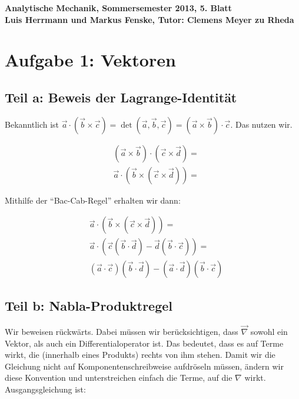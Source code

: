 \documentclass[a4paper,german,12pt,smallheadings]{scrartcl}
\begin{document}
\begin{center}
\bfseries %
\sffamily %
\vspace{-40pt}
Analytische Mechanik, Sommersemester 2013, 5. Blatt \\
Luis Herrmann und Markus Fenske, Tutor: Clemens Meyer zu Rheda
\vspace{-10pt}
\end{center}
\section*{Aufgabe 1: Vektoren}
\subsection*{Teil a: Beweis der Lagrange-Identität}

Bekanntlich ist $\vec{a} \cdot (\vec{b} \times \vec{c}) = \det(\vec{a},
\vec{b}, \vec{c}) = (\vec{a} \times \vec{b}) \cdot \vec{c}$. Das nutzen wir.

\begin{align*}
  &(\vec{a} \times \vec{b}) \cdot (\vec{c} \times \vec{d}) =\\
  &\vec{a} \cdot (\vec{b} \times (\vec{c} \times \vec{d})) =
\end{align*}

Mithilfe der ``Bac-Cab-Regel'' erhalten wir dann:

\begin{align*}
  &\vec{a} \cdot (\vec{b} \times (\vec{c} \times \vec{d})) =\\
  &\vec{a} \cdot (\vec{c}(\vec{b} \cdot \vec{d}) - \vec{d} (\vec{b} \cdot \vec{c})) =\\
  &(\vec{a} \cdot \vec{c})(\vec{b} \cdot \vec{d}) - (\vec{a} \cdot \vec{d}) (\vec{b} \cdot \vec{c})
\end{align*}

\subsection*{Teil b: Nabla-Produktregel}

Wir beweisen rückwärts. Dabei müssen wir berücksichtigen, dass $\vec{\nabla}$
sowohl ein Vektor, als auch ein Differentialoperator ist. Das bedeutet, dass es
auf Terme wirkt, die (innerhalb eines Produkts) rechts von ihm stehen. Damit
wir die Gleichung nicht auf Komponentenschreibweise aufdröseln müssen, ändern
wir diese Konvention und unterstreichen einfach die Terme, auf die $\nabla$
wirkt. Ausgangsgleichung ist:
\end{document}
